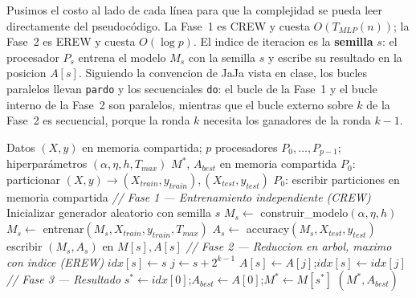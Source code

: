 \documentclass[11pt,a4paper]{article}
\begin{document}
Pusimos el costo al lado de cada línea para que la complejidad se pueda leer directamente del pseudocódigo. La Fase~1 es CREW y cuesta $O(T_{MLP}(n))$; la Fase~2 es EREW y cuesta $O(\log p)$. El indice de iteracion es la \textbf{semilla} $s$: el procesador $P_s$ entrena el modelo $M_s$ con la semilla $s$ y escribe su resultado en la posicion $A[s]$. Siguiendo la convencion de JaJa vista en clase, los bucles paralelos llevan \texttt{pardo} y los secuenciales \texttt{do}: el bucle de la Fase~1 y el bucle interno de la Fase~2 son paralelos, mientras que el bucle externo sobre $k$ de la Fase~2 es secuencial, porque la ronda $k$ necesita los ganadores de la ronda $k-1$.

\begin{algorithm}[H]
\caption{Entrenamiento paralelo de MLPs en PRAM (CREW/EREW)}
\label{alg:pram}
\begin{algorithmic}[1]
\Require Datos $(X,y)$ en memoria compartida; $p$ procesadores $P_0,\dots,P_{p-1}$; hiperparámetros $(\alpha,\eta,h,T_{max})$
\Ensure $M^*$, $A_{best}$ en memoria compartida
\State $P_0$: particionar $(X,y) \to (X_{train},y_{train}),(X_{test},y_{test})$ 
\State $P_0$: escribir particiones en memoria compartida 
\Statex \textit{// Fase 1 --- Entrenamiento independiente (CREW)}
    \State Inicializar generador aleatorio con semilla $s$ 
    \State $M_s \gets$ construir\_modelo$(\alpha,\eta,h)$ 
    \State $M_s \gets$ entrenar$(M_s, X_{train}, y_{train}, T_{max})$ 
    \State $A_s \gets$ accuracy$(M_s, X_{test}, y_{test})$ 
    \State escribir $(M_s,A_s)$ en $M[s], A[s]$ 
\EndFor
\Statex \textit{// Fase 2 --- Reduccion en arbol, maximo con indice (EREW)}
    \State $idx[s] \gets s$ 
\EndFor
{} 
        \State $j \gets s + 2^{k-1}$ 
         
            \State $A[s] \gets A[j]$;\quad $idx[s] \gets idx[j]$ 
        \EndIf
    \EndFor
\EndFor
\Statex \textit{// Fase 3 --- Resultado}
\State $s^* \gets idx[0]$;\quad $A_{best} \gets A[0]$;\quad $M^* \gets M[s^*]$ 
\State \Return $(M^*, A_{best})$
\end{algorithmic}
\end{algorithm}
\end{document}
